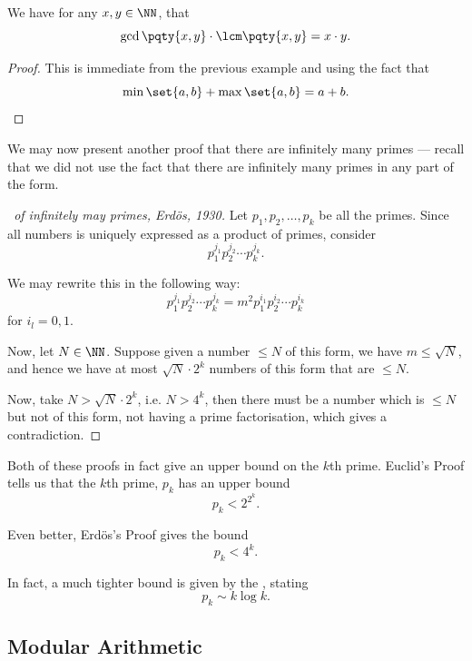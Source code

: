 \begin{proposition}
    We have for any \(x, y \in \NN\), that
    \[
        \gcd\pqty{x, y} \cdot \lcm\pqty{x, y} = x \cdot y.
    \]
\end{proposition}

\begin{proof}
    This is immediate from the previous example and using the fact that
    \[
        \min\set{a, b} + \max\set{a, b} = a + b.
    \]
\end{proof}

We may now present another proof that there are infinitely many primes --- recall that we did not use the fact that there are infinitely many primes in any part of the form.

\begin{proof}[\proofname\ of infinitely may primes, Erd\"{o}s, 1930]
    Let \(p_1, p_2, \ldots, p_k\) be all the primes. Since all numbers is uniquely expressed as a product of primes, consider
    \[
        p_1^{j_1} p_2^{j_2} \cdots p_k^{j_k}.
    \]

    We may rewrite this in the following way:
    \[
        p_1^{j_1} p_2^{j_2} \cdots p_k^{j_k} = m^2 p_1^{i_1} p_2^{i_2} \cdots p_k^{i_k}
    \]
    for \(i_l = 0, 1\).

    Now, let \(N \in \NN\). Suppose given a number \(\leq N\) of this form, we have \(m \leq \sqrt{N}\), and hence we have at most \(\sqrt{N} \cdot 2^k\) numbers of this form that are \(\leq N\).

    Now, take \(N > \sqrt{N} \cdot 2^k\), i.e. \(N > 4^k\), then there must be a number which is \(\leq N\) but not of this form, not having a prime factorisation, which gives a contradiction.
\end{proof}

\begin{remark}
    Both of these proofs in fact give an upper bound on the \(k\)th prime. Euclid's Proof tells us that the \(k\)th prime, \(p_k\) has an upper bound
    \[
        p_k < 2^{2^k}.
    \]

    Even better, Erd\"{o}s's Proof gives the bound
    \[
        p_k < 4^k.
    \]

    In fact, a much tighter bound is given by the , stating
    \[
        p_k \sim k \log k.
    \]
\end{remark}

\subsection{Modular Arithmetic}
\label{sec:modular-arithmetic}

